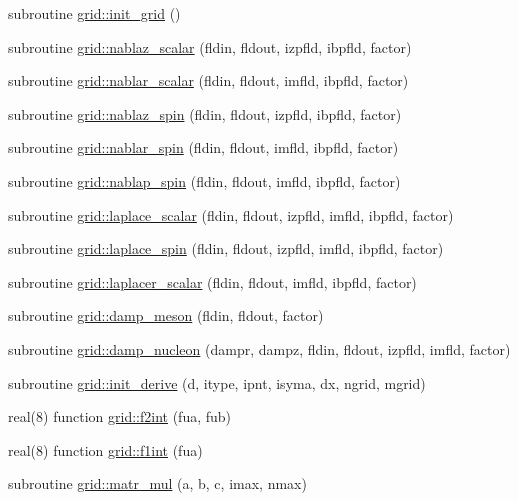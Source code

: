 \begin{DoxyCompactItemize}
\item 
subroutine \hyperlink{namespacegrid_a4cb599ddc037e470eb64f386a0971ea5}{grid\+::init\+\_\+grid} ()
\item 
subroutine \hyperlink{namespacegrid_a0d6ef544d8d744ea1c6b70658774a4b2}{grid\+::nablaz\+\_\+scalar} (fldin, fldout, izpfld, ibpfld, factor)
\item 
subroutine \hyperlink{namespacegrid_ab8b751012b26ee67998674d81747d532}{grid\+::nablar\+\_\+scalar} (fldin, fldout, imfld, ibpfld, factor)
\item 
subroutine \hyperlink{namespacegrid_a35f707d0d56204d4f6474c5808a93dbc}{grid\+::nablaz\+\_\+spin} (fldin, fldout, izpfld, ibpfld, factor)
\item 
subroutine \hyperlink{namespacegrid_ab4994ce54858ab4a5ca1d1f97260ebad}{grid\+::nablar\+\_\+spin} (fldin, fldout, imfld, ibpfld, factor)
\item 
subroutine \hyperlink{namespacegrid_a7030a73b3eff3d418914c2f94e6f5eca}{grid\+::nablap\+\_\+spin} (fldin, fldout, imfld, ibpfld, factor)
\item 
subroutine \hyperlink{namespacegrid_a40e9fda41c6370cd95343f7033601e1e}{grid\+::laplace\+\_\+scalar} (fldin, fldout, izpfld, imfld, ibpfld, factor)
\item 
subroutine \hyperlink{namespacegrid_a807f502b4225a59f7575c250a8ccd032}{grid\+::laplace\+\_\+spin} (fldin, fldout, izpfld, imfld, ibpfld, factor)
\item 
subroutine \hyperlink{namespacegrid_adb67b33df30984560a4a640e00a40f99}{grid\+::laplacer\+\_\+scalar} (fldin, fldout, imfld, ibpfld, factor)
\item 
subroutine \hyperlink{namespacegrid_a75afbba2c2a62cbb743d49cc49daa186}{grid\+::damp\+\_\+meson} (fldin, fldout, factor)
\item 
subroutine \hyperlink{namespacegrid_a07298a336f9ab0a423504ef5826db475}{grid\+::damp\+\_\+nucleon} (dampr, dampz, fldin, fldout, izpfld, imfld, factor)
\item 
subroutine \hyperlink{namespacegrid_a2e25b0f7ec79d19d9b91b80efd0489da}{grid\+::init\+\_\+derive} (d, itype, ipnt, isyma, dx, ngrid, mgrid)
\item 
real(8) function \hyperlink{namespacegrid_aa872a933c56de60d6abf31fd7bec2814}{grid\+::f2int} (fua, fub)
\item 
real(8) function \hyperlink{namespacegrid_a826ce21cf77769b59324009174610ab9}{grid\+::f1int} (fua)
\item 
subroutine \hyperlink{namespacegrid_a771bf7fcf3d65544eb8badcb0d8fe528}{grid\+::matr\+\_\+mul} (a, b, c, imax, nmax)

\end{DoxyCompactItemize}
